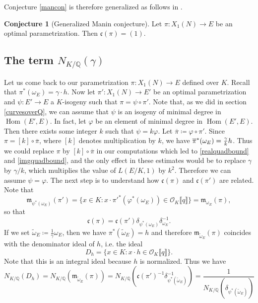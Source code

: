 \documentclass[11pt]{amsart}
\theoremstyle{definition}
\newtheorem{conj}[definizione]{Conjecture}
\begin{document}
		Conjecture \ref{mancon} is therefore generalized as follows in \cite{gola}.
			\begin{conj}[Generalized Manin conjecture]\label{genmancon}
				Let $\pi\colon X_1(N)\to E$ be an optimal parametrization. Then $\mathfrak c(\pi)=(1)$.
		\end{conj}
		
		\subsection{The term
\texorpdfstring{$N_{K/{\mathbb{Q}}}(\gamma)$}{}}
		Let us come back to our parametrization $\pi\colon X_1(N)\to E$ defined over $K$. Recall that $\pi^*(\omega_E)=\gamma\cdot h$. Now let $\pi'\colon X_1(N)\to E'$ be an optimal parametrization and $\psi\colon E'\to E$ a $K$-isogeny such that $\pi=\psi\circ \pi'$. Note that, as we did in section \ref{curvesoverQ}, we can assume that $\psi$ is an isogeny of minimal degree in $\operatorname{Hom}(E',E)$. In fact, let $\varphi$ be an element of minimal degree in $\operatorname{Hom}(E',E)$. Then there exists some integer $k$ such that $\psi=k\varphi$. Let $\overline{\pi}\coloneqq \varphi\circ\pi'$. Since $\pi=[k]\circ\overline{\pi}$, where $[k]$ denotes multiplication by $k$, we have ${\displaystyle} \overline{\pi}^*(\omega_E)=\frac{\gamma}{k}h$. Thus we could replace $\pi$ by $[k]\circ\overline{\pi}$ in our computations which led to \eqref{realquadbound} and \eqref{imgquadbound}, and the only effect in these estimates would be to replace $\gamma$ by $\gamma/k$, which multiplies the value of $L(E/K,1)$ by $k^2$. Therefore we can assume $\psi=\varphi$.
		The next step is to understand how $\mathfrak c(\pi)$ and $\mathfrak c(\pi')$ are related. Note that
		$$\mathfrak m_{\psi^*(\omega_E)}(\pi')=\{x\in K\colon x\cdot \pi'^*(\varphi^*(\omega_E))\in {\mathcal{O}}_K\llbracket q\rrbracket\}=\mathfrak m_{\omega_E}(\pi),$$
		so that
		$$\mathfrak c(\pi)=\mathfrak c(\pi')\delta_{\psi^*(\omega_E)}\delta_{\omega_E}^{-1}.$$
		If we set $\widetilde{\omega}_E\coloneqq \frac{1}{\gamma}\omega_E$, then we have $\pi^*(\widetilde{\omega}_E)=h$ and therefore $\mathfrak m_{\widetilde{\omega}_E}(\pi)$ coincides with the denominator ideal of $h$, i.e. the ideal
		$$D_h=\{x\in K\colon x\cdot h\in {\mathcal{O}}_K\llbracket q\rrbracket\}.$$
		Note that this is an integral ideal because $h$ is normalized. Thus we have
			\begin{equation}\label{denomideal}
				N_{K/{\mathbb{Q}}}(D_h)=N_{K/{\mathbb{Q}}}(\mathfrak m_{\widetilde{\omega}_E}(\pi))=N_{K/{\mathbb{Q}}}(\mathfrak c(\pi')^{-1}\delta_{\psi^*(\widetilde{\omega}_E)}^{-1})=\frac{1}{N_{K/{\mathbb{Q}}}(\delta_{\psi^*(\widetilde{\omega}_E)})}
		\end{equation}
\end{document}
